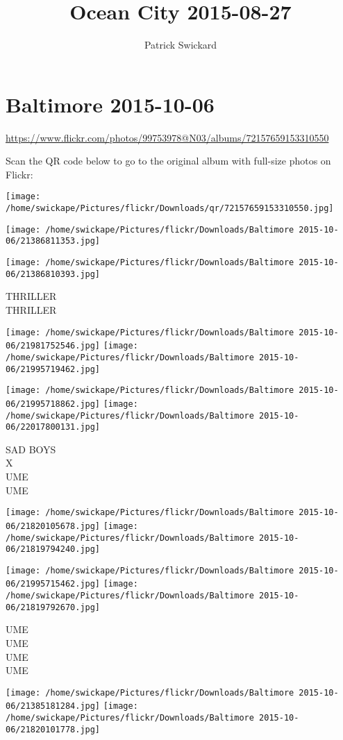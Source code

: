 \documentclass[10pt,letterpaper]{article}
\title{Ocean City 2015-08-27}
\author{Patrick Swickard}
\date{}
\begin{document}
\section*{Baltimore 2015-10-06}

\url{https://www.flickr.com/photos/99753978@N03/albums/72157659153310550}

Scan the QR code below to go to the original album with full-size photos on Flickr:

\texttt{[image: /home/swickape/Pictures/flickr/Downloads/qr/72157659153310550.jpg]}
\pagebreak

\texttt{[image: /home/swickape/Pictures/flickr/Downloads/Baltimore 2015-10-06/21386811353.jpg]}

\vspace{0.25in}
\texttt{[image: /home/swickape/Pictures/flickr/Downloads/Baltimore 2015-10-06/21386810393.jpg]}

THRILLER\\
THRILLER
\pagebreak

\texttt{[image: /home/swickape/Pictures/flickr/Downloads/Baltimore 2015-10-06/21981752546.jpg]}
\texttt{[image: /home/swickape/Pictures/flickr/Downloads/Baltimore 2015-10-06/21995719462.jpg]}

\texttt{[image: /home/swickape/Pictures/flickr/Downloads/Baltimore 2015-10-06/21995718862.jpg]}
\texttt{[image: /home/swickape/Pictures/flickr/Downloads/Baltimore 2015-10-06/22017800131.jpg]}

SAD BOYS\\
X\\
UME\\
UME
\pagebreak

\texttt{[image: /home/swickape/Pictures/flickr/Downloads/Baltimore 2015-10-06/21820105678.jpg]}
\texttt{[image: /home/swickape/Pictures/flickr/Downloads/Baltimore 2015-10-06/21819794240.jpg]}

\texttt{[image: /home/swickape/Pictures/flickr/Downloads/Baltimore 2015-10-06/21995715462.jpg]}
\texttt{[image: /home/swickape/Pictures/flickr/Downloads/Baltimore 2015-10-06/21819792670.jpg]}

UME\\
UME\\
UME\\
UME
\pagebreak

\texttt{[image: /home/swickape/Pictures/flickr/Downloads/Baltimore 2015-10-06/21385181284.jpg]}
\texttt{[image: /home/swickape/Pictures/flickr/Downloads/Baltimore 2015-10-06/21820101778.jpg]}
\end{document}
